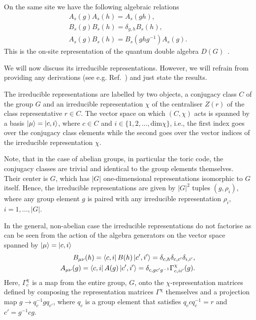 \documentclass[a4paper,twocolumn,11pt]{quantumarticle}
\begin{document}
On the same site we have the following algebraic relations 
\begin{equation}
    \begin{split}
        A_s{(g)}A_s{(h)} = A_s{(gh)}, \\
        B_s{(g)}B_s{(h)} = \delta_{g,h} B_s{(h)},\\
        A_s{(g)}B_s{(h)} = B_s{(ghg^{-1})}A_s{(g)}.
    \end{split}\label{eqn:alg}
\end{equation}
This is the on-site representation of the quantum double algebra $D(G)$~\cite{cui2018topological, Kitaev_2003}. 



We will now discuss its irreducible representations. However, we will refrain from providing any derivations (see e.g. Ref.~\cite{Cui_2015}) and just state the results. 

The irreducible representations are labelled by two objects, a conjugacy class $C$ of the group $G$ and an irreducible representation $\chi$ of the centraliser $Z(r)$ of the class representative $r \in C$. The vector space on which $(C, \chi)$ acts is spanned by a basis $\ket{\mu} = \ket{c, i}$, where $c \in C$ and $i \in \{1, 2, \ldots, \text{dim}\chi\}$, i.e., the first index goes over the conjugacy class elements while the second goes over the vector indices of the irreducible representation $\chi$.

Note, that in the case of abelian groups, in particular the toric code, the conjugacy classes are trivial and identical to the group elements themselves. Their center is $G$, which has $|G|$ one-dimensional representations isomorphic to $G$ itself. Hence, the irreducible representations are given by $|G|^2$ tuples $(g,\rho_i)$, where any group element $g$ is paired with any irreducible representation $\rho_i$, $i=1,\ldots, |G|$.

In the general, non-abelian case the irreducible representations do not factorise as can be seen from the action of the algebra generators on the vector space spanned by $\ket{\mu}=\ket{c,i}$ %
\begin{equation}
    \begin{split}
        B_{\mu\nu}{(h)}=\bra{c, i} B{(h)} \ket{c', i'} = \delta_{c, h} \delta_{c, c'}\delta_{i, i'}, \\
        A_{\mu\nu}{(g)}= \bra{c, i} A{(g)} \ket{c', i'} = \delta_{c,gc'g^{-1}} \Gamma^\chi_{c,ii'}(g).
    \end{split}
\end{equation}
Here, $\Gamma^\chi_c$ is a map from the entire group, $G$, onto the $\chi$-representation matrices defined by composing the representation matrices $\Gamma^\chi$ themselves and a projection map $g \to q_{c}^{-1}gq_{c'}$, where $q_c$ is a group element that satisfies $q_c c q_c^{-1} = r$ and $c'=g^{-1}cg$.
\end{document}
